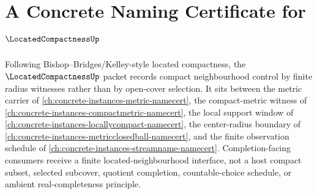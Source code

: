 \chapter{A Concrete Naming Certificate for $\LocatedCompactnessUp$}
\label{ch:concrete-instances-located-compactness-namecert}

Following Bishop--Bridges/Kelley-style located compactness, the $\LocatedCompactnessUp$ packet records compact neighbourhood control by finite radius witnesses rather than by open-cover selection. It sits between the metric carrier of \autoref{ch:concrete-instances-metric-namecert}, the compact-metric witness of \autoref{ch:concrete-instances-compactmetric-namecert}, the local support window of \autoref{ch:concrete-instances-locallycompact-namecert}, the center-radius boundary of \autoref{ch:concrete-instances-metricclosedball-namecert}, and the finite observation schedule of \autoref{ch:concrete-instances-streamname-namecert}. Completion-facing consumers receive a finite located-neighbourhood interface, not a host compact subset, selected subcover, quotient completion, countable-choice schedule, or ambient real-completeness principle.

